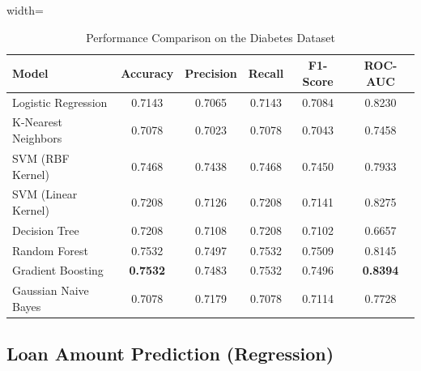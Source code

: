 \documentclass[12pt,a4paper]{article}
\begin{document}
\begin{table}[H]
\centering
\caption{Performance Comparison on the Diabetes Dataset}
\label{tab:diabetes_results}

\renewcommand{\arraystretch}{1.2}

\begin{adjustbox}{width=\textwidth}
\begin{tabular}{|l|c|c|c|c|c|}

\toprule

\textbf{Model}
&
\textbf{Accuracy}
&
\textbf{Precision}
&
\textbf{Recall}
&
\textbf{F1-Score}
&
\textbf{ROC-AUC}

\\

\midrule

Logistic Regression &
0.7143 &
0.7065 &
0.7143 &
0.7084 &
0.8230 \\

K-Nearest Neighbors &
0.7078 &
0.7023 &
0.7078 &
0.7043 &
0.7458 \\

SVM (RBF Kernel) &
0.7468 &
0.7438 &
0.7468 &
0.7450 &
0.7933 \\

SVM (Linear Kernel) &
0.7208 &
0.7126 &
0.7208 &
0.7141 &
0.8275 \\

Decision Tree &
0.7208 &
0.7108 &
0.7208 &
0.7102 &
0.6657 \\

Random Forest &
0.7532 &
0.7497 &
0.7532 &
0.7509 &
0.8145 \\

Gradient Boosting &
\textbf{0.7532} &
0.7483 &
0.7532 &
0.7496 &
\textbf{0.8394} \\

Gaussian Naive Bayes &
0.7078 &
0.7179 &
0.7078 &
0.7114 &
0.7728 \\

\bottomrule

\end{tabular}
\end{adjustbox}

\end{table}

\subsection{Loan Amount Prediction (Regression)}
\end{document}

